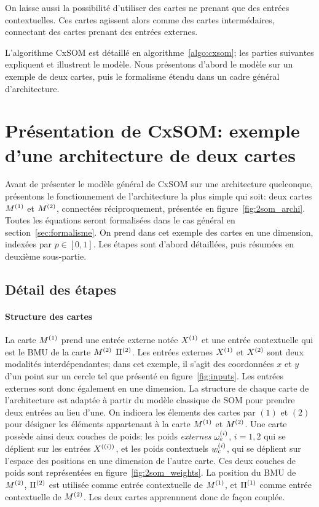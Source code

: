 On laisse aussi la possibilité d'utiliser des cartes ne prenant que des entrées contextuelles. Ces cartes agissent alors comme des cartes intermédaires, connectant des cartes prenant des entrées externes.

L'algorithme CxSOM est détaillé en algorithme~\ref{algo:cxsom}; les parties suivantes expliquent et illustrent le modèle. Nous présentons d'abord le modèle sur un exemple de deux cartes, puis le formalisme étendu dans un cadre général d'architecture.

\section{Présentation de CxSOM: exemple d'une architecture de deux cartes}

Avant de présenter le modèle général de CxSOM sur une architecture quelconque, présentons le fonctionnement de l'architecture la plus simple qui soit: deux cartes $M^{({1})}$ et $M^{({2})}$, connectées réciproquement, présentée en figure~\ref{fig:2som_archi}. Toutes les équations seront formalisées dans le cas général en section~\ref{sec:formalisme}. 
On prend dans cet exemple des cartes en une dimension, indexées par $p \in [0,1]$. Les étapes sont d'abord détaillées, puis résumées en deuxième sous-partie.

\subsection{Détail des étapes}
\paragraph{Structure des cartes}
La carte $M^{({1})}$ prend une entrée externe notée $X^{({1})}$ et une entrée contextuelle qui est le BMU de la carte $M^{({2})}$ $\Pi^{({2})}$. Les entrées externes $X^{({1})}$ et $X^{({2})}$ sont deux modalités interdépendantes; dans cet exemple, il s'agit des coordonnées $x$ et $y$ d'un point sur un cercle tel que présenté en figure~\ref{fig:inputs}. Les entrées externes sont donc également en une dimension.
La structure de chaque carte de l'architecture est adaptée à partir du modèle classique de SOM pour prendre deux entrées au lieu d'une. On indicera les élements des cartes par $(1)$ et $(2)$ pour désigner les éléments appartenant à la carte $M^{({1})}$ et $M^{({2})}$.
Une carte possède ainsi deux couches de poids: les poids \emph{externes} $\omega_e^{({i})}$, $i=1,2$ qui se déplient sur les entrées $X^{({(i)})}$, et les poids contextuels $w_c^{({i})}$, qui se déplient sur l'espace des positions en une dimension de l'autre carte. Ces deux couches de poids sont représentées en figure~\ref{fig:2som_weights}. La position du BMU de $M^{({2})}$, $\Pi^{({2})}$ est utilisée comme entrée contextuelle de $M^{({1})}$, et $\Pi^{({1})}$ comme entrée contextuelle de $M^{({2})}$. Les deux cartes apprennnent donc de façon couplée.

